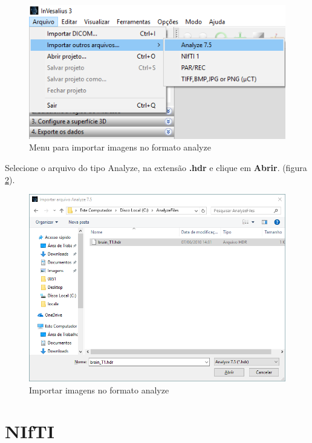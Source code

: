 \begin{figure}[!htb]
\centering
\includegraphics[scale=0.4]{../user_guide_figures/invesalius_screen/import_analyze_menu_pt.png}
\caption{Menu para importar imagens no formato analyze}
\label{fig:analyze_menu}
\end{figure}

Selecione o arquivo do tipo Analyze, na extensão \textbf{.hdr} e clique em \textbf{Abrir}. (figura \ref{fig:analyze_import}).

\begin{figure}[!htb]
\centering
\includegraphics[scale=0.4]{../user_guide_figures/invesalius_screen/import_analyze_window_pt.png}
\caption{Importar imagens no formato analyze}
\label{fig:analyze_import}
\end{figure}

\section{NIfTI}


